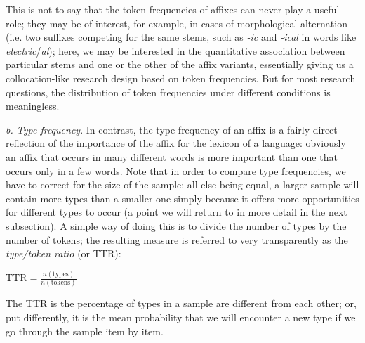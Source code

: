 This is not to say that the token  frequencies  of affixes  can never play a useful role; they may be of interest, for example, in cases of morphological  alternation  (i.e. two suffixes  competing for the same stems,  such as \textit{-ic} and \textit{-ical} in words like \textit{electric}\slash \textit{al}); here, we may be interested in the quantitative association  between particular stems and one or the other of the affix  variants, essentially giving us a collocation\hyp{}like  research design  based on token frequencies.  But for most research questions, the distribution  of token frequencies under different conditions is meaningless.

\textit{b. Type frequency}. In contrast, the type  frequency  of an affix  is a fairly direct reflection of the importance of the affix  for the lexicon  of a language: obviously an affix  that occurs in many different words is more important than one that occurs only in a few words. Note that in order to compare type frequencies, we have to correct for the size  of the sample: all else being equal, a larger sample will contain more types than a smaller one simply because it offers more opportunities for different types  to occur (a point we will return to in more detail in the next subsection). A simple way of doing this is to divide the number of types by the number of tokens;  the resulting measure is referred to very transparently as the \textit{type\slash token ratio} (or  TTR):

\begin{exe}
\ex $\displaystyle{\text{TTR} = \frac{n \left( \text{types} \right) }{n \left( \text{tokens} \right)}}$
\label{ex:ttrformula}
\end{exe}

The TTR  is the percentage of types  in a sample are different from each other; or, put differently, it is the mean  probability  that we will encounter a new type if we go through the sample item by item.

